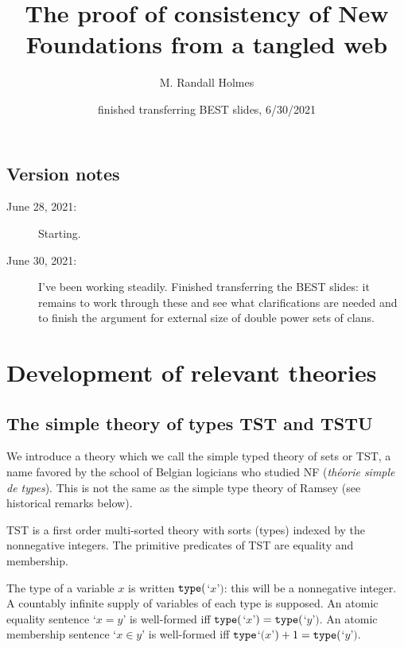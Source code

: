 \documentclass[12pt]{article}
\title{The proof of consistency of New Foundations from a tangled web}
\author{M. Randall Holmes}
\date{finished transferring BEST slides, 6/30/2021}
\begin{document}
\maketitle

\maketitle

\newpage

\subsection{Version notes}

\begin{description}

\item[June 28, 2021:]  Starting.

\item[June 30, 2021:]  I've been working steadily.  Finished transferring the BEST slides:  it remains to work through these and see what clarifications are needed and to finish the
argument for external size of double power sets of clans.

\end{description}


\newpage

\tableofcontents

\newpage

\section{Development of relevant theories}

\subsection{The simple theory of types TST and TSTU}

We introduce a theory which we call the simple typed theory of sets or TST, a name favored by the school of Belgian logicians who studied NF ({\em th\'eorie simple de types}).  This is not the same as the simple type theory of Ramsey (see historical remarks below).

TST is a first order multi-sorted theory with sorts (types) indexed by the nonnegative integers.  The primitive predicates of TST are equality and membership.

The type of a variable $x$ is written ${\tt type}($`$x$'$)$:  this will be a nonnegative integer.   A countably infinite supply of variables of each type is supposed.  An atomic equality sentence `$x=y$' is well-formed iff ${\tt type}($`$x$'$)={\tt type}($`$y$'$)$.
An atomic membership sentence `$x \in y$' is well-formed iff ${\tt type}$`$(x$'$)+1 = {\tt type}($`$y$'$)$.
\end{document}
